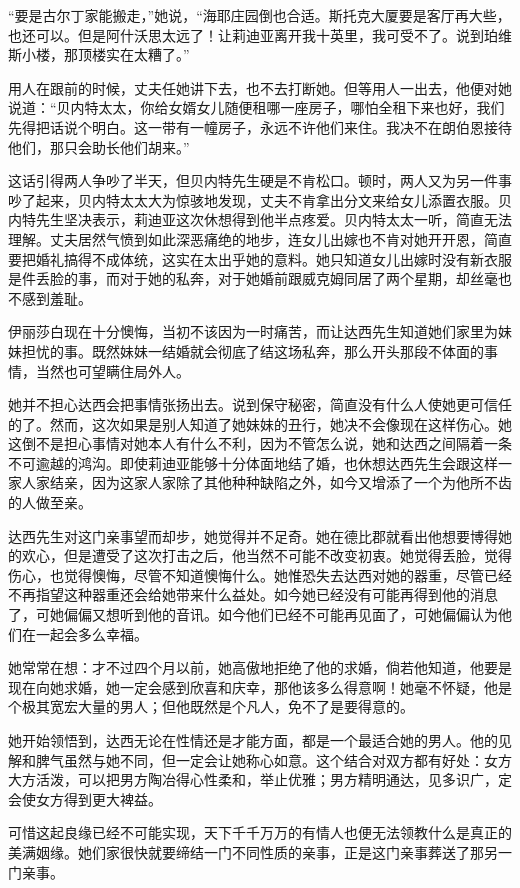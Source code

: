\par “要是古尔丁家能搬走，”她说，“海耶庄园倒也合适。斯托克大厦要是客厅再大些，也还可以。但是阿什沃思太远了！让莉迪亚离开我十英里，我可受不了。说到珀维斯小楼，那顶楼实在太糟了。”
\par 用人在跟前的时候，丈夫任她讲下去，也不去打断她。但等用人一出去，他便对她说道：“贝内特太太，你给女婿女儿随便租哪一座房子，哪怕全租下来也好，我们先得把话说个明白。这一带有一幢房子，永远不许他们来住。我决不在朗伯恩接待他们，那只会助长他们胡来。”
\par 这话引得两人争吵了半天，但贝内特先生硬是不肯松口。顿时，两人又为另一件事吵了起来，贝内特太太大为惊骇地发现，丈夫不肯拿出分文来给女儿添置衣服。贝内特先生坚决表示，莉迪亚这次休想得到他半点疼爱。贝内特太太一听，简直无法理解。丈夫居然气愤到如此深恶痛绝的地步，连女儿出嫁也不肯对她开开恩，简直要把婚礼搞得不成体统，这实在太出乎她的意料。她只知道女儿出嫁时没有新衣服是件丢脸的事，而对于她的私奔，对于她婚前跟威克姆同居了两个星期，却丝毫也不感到羞耻。
\par 伊丽莎白现在十分懊悔，当初不该因为一时痛苦，而让达西先生知道她们家里为妹妹担忧的事。既然妹妹一结婚就会彻底了结这场私奔，那么开头那段不体面的事情，当然也可望瞒住局外人。
\par 她并不担心达西会把事情张扬出去。说到保守秘密，简直没有什么人使她更可信任的了。然而，这次如果是别人知道了她妹妹的丑行，她决不会像现在这样伤心。她这倒不是担心事情对她本人有什么不利，因为不管怎么说，她和达西之间隔着一条不可逾越的鸿沟。即使莉迪亚能够十分体面地结了婚，也休想达西先生会跟这样一家人家结亲，因为这家人家除了其他种种缺陷之外，如今又增添了一个为他所不齿的人做至亲。
\par 达西先生对这门亲事望而却步，她觉得并不足奇。她在德比郡就看出他想要博得她的欢心，但是遭受了这次打击之后，他当然不可能不改变初衷。她觉得丢脸，觉得伤心，也觉得懊悔，尽管不知道懊悔什么。她惟恐失去达西对她的器重，尽管已经不再指望这种器重还会给她带来什么益处。如今她已经没有可能再得到他的消息了，可她偏偏又想听到他的音讯。如今他们已经不可能再见面了，可她偏偏认为他们在一起会多么幸福。
\par 她常常在想：才不过四个月以前，她高傲地拒绝了他的求婚，倘若他知道，他要是现在向她求婚，她一定会感到欣喜和庆幸，那他该多么得意啊！她毫不怀疑，他是个极其宽宏大量的男人；但他既然是个凡人，免不了是要得意的。
\par 她开始领悟到，达西无论在性情还是才能方面，都是一个最适合她的男人。他的见解和脾气虽然与她不同，但一定会让她称心如意。这个结合对双方都有好处：女方大方活泼，可以把男方陶冶得心性柔和，举止优雅；男方精明通达，见多识广，定会使女方得到更大裨益。
\par 可惜这起良缘已经不可能实现，天下千千万万的有情人也便无法领教什么是真正的美满姻缘。她们家很快就要缔结一门不同性质的亲事，正是这门亲事葬送了那另一门亲事。

